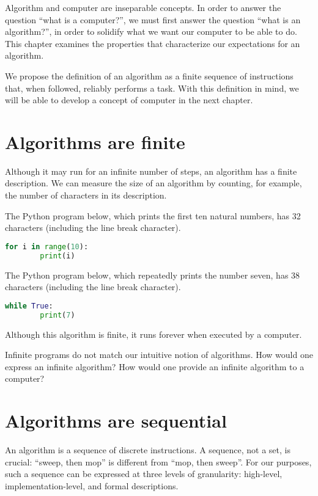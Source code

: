 Algorithm and computer are inseparable concepts.
In order to answer the question ``what is a computer?'', we must first answer the question ``what is an algorithm?'', in order to solidify what we want our computer to be able to do.
This chapter examines the properties that characterize our expectations for an algorithm.

We propose the definition of an algorithm as a finite sequence of instructions that, when followed, reliably performs a task.
With this definition in mind, we will be able to develop a concept of computer in the next chapter.

\section{Algorithms are finite}

Although it may run for an infinite number of steps, an algorithm has a finite description.
We can measure the size of an algorithm by counting, for example, the number of characters in its description.

\begin{example}
  The Python program below, which prints the first ten natural numbers, has 32 characters (including the line break character).
  \begin{lstlisting}[language=Python]
    for i in range(10):
        print(i)
  \end{lstlisting}
\end{example}

\begin{example}
  The Python program below, which repeatedly prints the number seven, has 38 characters (including the line break character).
  \begin{lstlisting}[language=Python]
    while True:
        print(7)
  \end{lstlisting}
  Although this algorithm is finite, it runs forever when executed by a computer.
\end{example}

Infinite programs do not match our intuitive notion of algorithms.
How would one express an infinite algorithm?
How would one provide an infinite algorithm to a computer?

\section{Algorithms are sequential}

An algorithm is a sequence of discrete instructions.
A sequence, not a set, is crucial: ``sweep, then mop'' is different from ``mop, then sweep''.
For our purposes, such a sequence can be expressed at three levels of granularity: high-level, implementation-level, and formal descriptions.

